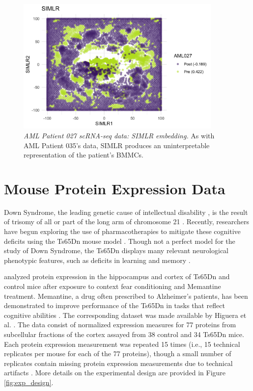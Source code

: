 \documentclass{article}
\begin{document}
\begin{figure}[!htbp]
    \centering
    \includegraphics[width=0.9\textwidth]{figures/aml027_SIMLR.png}
    \caption{
    {\em AML Patient 027 scRNA-seq data: SIMLR embedding.} As with AML Patient 035's data, SIMLR produces an uninterpretable representation of the patient's BMMCs.}
    \label{fig:SIMLR_aml_027}
\end{figure}

\FloatBarrier

\section{Mouse Protein Expression Data}\label{sup_mice}

Down Syndrome, the leading genetic cause of intellectual disability \citep{Irving2008}, is the result of trisomy of all or part of the long arm of chromosome 21 \citep{Ahmed2015}. Recently, researchers have begun exploring the use of pharmacotherapies to mitigate these cognitive deficits using the Ts65Dn mouse model \citep{Ahmed2015,Higuera2015}. Though not a perfect model for the study of Down Syndrome, the Ts65Dn displays many relevant neurological phenotypic features, such as deficits in learning and memory \citep{Rueda2012}.

\citet{Ahmed2015} analyzed protein expression in the hippocampus and cortex of Ts65Dn and control mice after exposure to context fear conditioning and Memantine treatment. Memantine, a drug often prescribed to Alzheimer's patients, has been demonstrated to improve performance of the Ts65Dn in tasks that reflect cognitive abilities \citep{Ahmed2015}. The corresponding dataset was made available by Higuera et al. \citep{Higuera2015}. The data consist of normalized expression measures for 77 proteins from subcellular fractions of the cortex assayed from 38 control and 34 Ts65Dn mice. Each protein expression measurement was repeated 15 times (i.e., 15 technical replicates per mouse for each of the 77 proteins), though a small number of replicates contain missing protein expression measurements due to technical artifacts \citep{Higuera2015}. More details on the experimental design are provided in Figure \ref{fig:exp_design}.
\end{document}
